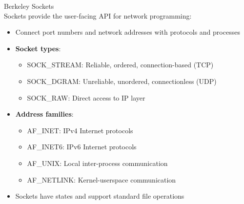 \begin{definition}{Berkeley Sockets}\\
    Sockets provide the user-facing API for network programming:
    \begin{itemize}
        \item Connect port numbers and network addresses with protocols and processes
        \item \textbf{Socket types}:
            \begin{itemize}
                \item SOCK\_STREAM: Reliable, ordered, connection-based (TCP)
                \item SOCK\_DGRAM: Unreliable, unordered, connectionless (UDP)
                \item SOCK\_RAW: Direct access to IP layer
            \end{itemize}
        \item \textbf{Address families}:
            \begin{itemize}
                \item AF\_INET: IPv4 Internet protocols
                \item AF\_INET6: IPv6 Internet protocols
                \item AF\_UNIX: Local inter-process communication
                \item AF\_NETLINK: Kernel-userspace communication
            \end{itemize}
        \item Sockets have states and support standard file operations
    \end{itemize}
\end{definition}

